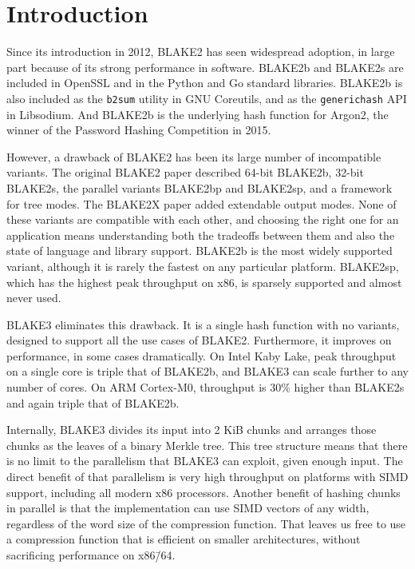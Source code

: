 \documentclass[11pt,notitlepage,a4paper]{article}
\begin{document}
\smallskip

\section{Introduction}\label{sec:intro}

Since its introduction in 2012, BLAKE2 has seen widespread adoption, in large
part because of its strong performance in software. BLAKE2b and BLAKE2s are
included in OpenSSL and in the Python and Go standard libraries. BLAKE2b is
also included as the \texttt{b2sum} utility in GNU Coreutils, and as the
\texttt{generichash} API in Libsodium. And BLAKE2b is the underlying hash
function for Argon2, the winner of the Password Hashing Competition in 2015.

However, a drawback of BLAKE2 has been its large number of incompatible
variants. The original BLAKE2 paper described 64-bit BLAKE2b, 32-bit BLAKE2s,
the parallel variants BLAKE2bp and BLAKE2sp, and a framework for tree modes.
The BLAKE2X paper added extendable output modes. None of these variants are
compatible with each other, and choosing the right one for an application means
understanding both the tradeoffs between them and also the state of language
and library support. BLAKE2b is the most widely supported variant, although it
is rarely the fastest on any particular platform. BLAKE2sp, which has the
highest peak throughput on x86, is sparsely supported and almost never used.

BLAKE3 eliminates this drawback. It is a single hash function with no variants,
designed to support all the use cases of BLAKE2. Furthermore, it improves on
performance, in some cases dramatically. On Intel Kaby Lake, peak throughput on
a single core is triple that of BLAKE2b, and BLAKE3 can scale further to any
number of cores. On ARM Cortex-M0, throughput is 30\% higher than BLAKE2s and
again triple that of BLAKE2b.

Internally, BLAKE3 divides its input into 2 KiB chunks and arranges those
chunks as the leaves of a binary Merkle tree. This tree structure means that
there is no limit to the parallelism that BLAKE3 can exploit, given enough
input. The direct benefit of that parallelism is very high throughput on
platforms with SIMD support, including all modern x86 processors. Another
benefit of hashing chunks in parallel is that the implementation can use SIMD
vectors of any width, regardless of the word size of the compression function.
That leaves us free to use a compression function that is efficient on smaller
architectures, without sacrificing performance on x86\=/64.
\end{document}
